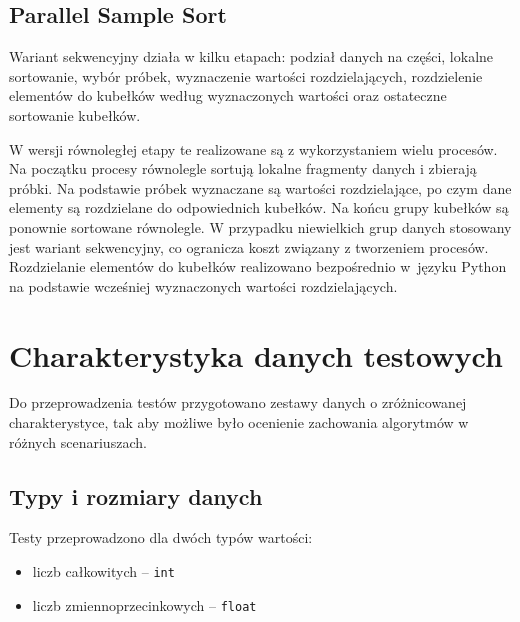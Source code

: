 

\subsection*{Parallel Sample Sort}

Wariant sekwencyjny działa w kilku etapach: podział danych na części, lokalne sortowanie, wybór próbek, wyznaczenie wartości rozdzielających, 
rozdzielenie elementów do kubełków według wyznaczonych wartości oraz ostateczne sortowanie kubełków.



W wersji równoległej etapy te realizowane są z wykorzystaniem wielu procesów. 
Na początku procesy równolegle sortują lokalne fragmenty danych i zbierają próbki. 
Na podstawie próbek wyznaczane są wartości rozdzielające, po czym dane elementy są rozdzielane do odpowiednich kubełków. 
Na końcu grupy kubełków są ponownie sortowane równolegle. 
W przypadku niewielkich grup danych stosowany jest wariant sekwencyjny, co ogranicza koszt związany z tworzeniem procesów.
Rozdzielanie elementów do kubełków realizowano bezpośrednio w~języku Python na podstawie wcześniej wyznaczonych wartości rozdzielających. 



\section{Charakterystyka danych testowych}
\label{sec:DaneTestowane}

Do przeprowadzenia testów przygotowano zestawy danych o zróżnicowanej charakterystyce, 
tak aby możliwe było ocenienie zachowania algorytmów w różnych scenariuszach.

\subsection*{Typy i rozmiary danych}

Testy przeprowadzono dla dwóch typów wartości:
\begin{itemize}
    \item liczb całkowitych -- \texttt{int}
    \item liczb zmiennoprzecinkowych -- \texttt{float}
\end{itemize}

